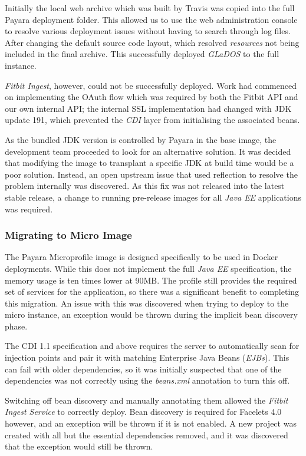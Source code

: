 Initially the local web archive which was built by Travis was copied into the full Payara deployment folder. This allowed us to use the web administration console to resolve various deployment issues without having to search through log files. After changing the default source code layout, which resolved \textit{resources} not being included in the final archive. This successfully deployed \textit{GLaDOS} to the full instance.

\textit{Fitbit Ingest}, however, could not be successfully deployed. Work had commenced on implementing the OAuth flow which was required by both the Fitbit API and our own internal API; the internal SSL implementation had changed with JDK update 191, which prevented the \textit{CDI} layer from initialising the associated beans.

As the bundled JDK version is controlled by Payara in the base image, the development team proceeded to look for an alternative solution. It was decided that modifying the image to transplant a specific JDK at build time would be a poor solution. Instead, an open upstream issue\cite{payara_ssl_issue} that used reflection to resolve the problem internally was discovered. As this fix was not released into the latest stable release, a change to running pre-release images for all \textit{Java EE} applications was required.

\subsubsection{Migrating to Micro Image}
The Payara Microprofile image is designed specifically to be used in Docker deployments. While this does not implement the full \textit{Java EE} specification, the memory usage is ten times lower at 90MB. The profile still provides the required set of services for the application, so there was a significant benefit to completing this migration. An issue with this was discovered when trying to deploy to the micro instance, an exception would be thrown during the implicit bean discovery phase.

The CDI 1.1 specification and above requires the server to automatically scan for injection points and pair it with matching Enterprise Java Beans (\textit{EJBs}). This can fail with older dependencies, so it was initially suspected that one of the dependencies was not correctly using the \textit{beans.xml} annotation to turn this off.

Switching off bean discovery and manually annotating them allowed the \textit{Fitbit Ingest Service} to correctly deploy. Bean discovery is required for Facelets 4.0 however, and an exception will be thrown if it is not enabled. A new project was created with all but the essential dependencies removed, and it was discovered that the exception would still be thrown.

